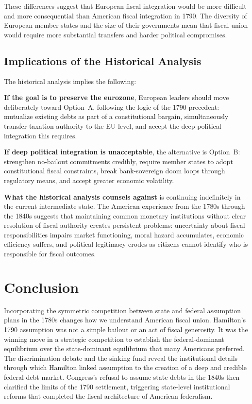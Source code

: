 \documentclass[12pt]{article}
\begin{document}
These differences suggest that European fiscal integration would be more
difficult and more consequential than American fiscal integration in
1790. The diversity of European member states and the size of their
governments mean that fiscal union would require more substantial
transfers and harder political compromises.

\subsection{Implications of the Historical Analysis}

The historical analysis implies the following:

\textbf{If the goal is to preserve the eurozone}, European leaders should
move deliberately toward Option~A, following the logic of the 1790
precedent: mutualize existing debts as part of a constitutional bargain,
simultaneously transfer taxation authority to the EU level, and accept
the deep political integration this requires.

\textbf{If deep political integration is unacceptable}, the alternative
is Option~B: strengthen no-bailout commitments credibly, require member
states to adopt constitutional fiscal constraints, break bank-sovereign
doom loops through regulatory means, and accept greater economic
volatility.

\textbf{What the historical analysis counsels against} is continuing
indefinitely in the current intermediate state. The American experience
from the 1780s through the 1840s suggests that maintaining common
monetary institutions without clear resolution of fiscal authority
creates persistent problems: uncertainty about fiscal responsibilities
impairs market functioning, moral hazard accumulates, economic efficiency
suffers, and political legitimacy erodes as citizens cannot identify who
is responsible for fiscal outcomes.


\section{Conclusion}

Incorporating the symmetric competition between state and federal
assumption plans in the 1780s changes how we understand American fiscal
union. Hamilton's 1790 assumption was not a simple bailout or an act of
fiscal generosity. It was the winning move in a strategic competition to
establish the federal-dominant equilibrium over the state-dominant
equilibrium that many Americans preferred. The discrimination debate
and the sinking fund reveal the institutional details through which
Hamilton linked assumption to the creation of a deep and credible federal
debt market. Congress's refusal to assume state debts in the 1840s then
clarified the limits of the 1790 settlement, triggering state-level
institutional reforms that completed the fiscal architecture of American
federalism.
\end{document}
